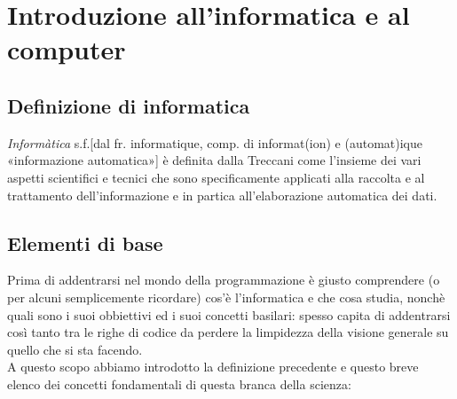 \chapter{Introduzione all'informatica e al computer}
\section{Definizione di informatica}
\textit{Informàtica} s.f.[dal fr. informatique, comp. di informat(ion) e (automat)ique «informazione automatica»] è definita dalla Treccani come l’insieme dei vari aspetti scientifici e tecnici che sono specificamente applicati alla raccolta e al trattamento dell’informazione e in partica all’elaborazione automatica dei dati.

\section{Elementi di base}
Prima di addentrarsi nel mondo della programmazione è giusto comprendere (o per alcuni semplicemente ricordare) cos'è l'informatica e che cosa studia, nonchè quali sono i suoi obbiettivi ed i suoi concetti basilari: spesso capita di addentrarsi così tanto tra le righe di codice da perdere la limpidezza della visione generale su quello che si sta facendo.\\ 
A questo scopo abbiamo introdotto la definizione precedente e questo breve elenco dei concetti fondamentali di questa branca della scienza:
